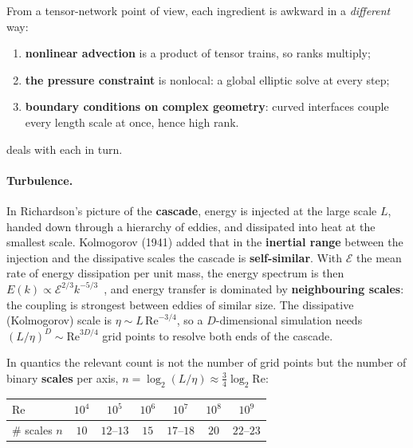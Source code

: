 From a tensor-network point of view, each ingredient is awkward in a
\emph{different} way:
\begin{enumerate}
  \item \textbf{nonlinear advection} is a product of tensor trains, so ranks
    multiply;
  \item \textbf{the pressure constraint} is nonlocal: a global elliptic solve
    at every step;
  \item \textbf{boundary conditions on complex geometry}: curved interfaces
    couple every length scale at once, hence high rank.
\end{enumerate}
\noindent
{} deals with each in turn.

\paragraph{Turbulence.}
In Richardson's picture of the \textbf{cascade}, energy is injected at the large
scale $L$, handed down through a hierarchy of eddies, and dissipated into heat at
the smallest scale. Kolmogorov (1941) added that in the \textbf{inertial range}
between the injection and the dissipative scales the cascade is
\textbf{self-similar}. With $\mathcal{E}$ the mean rate of energy dissipation per
unit mass, the energy spectrum is then
$E(k) \propto \mathcal{E}^{2/3} k^{-5/3}$~\cite{Kolmogorov1941,Frisch1995}, and
energy transfer is dominated by \textbf{neighbouring scales}: the coupling is
strongest between eddies of similar size. The dissipative (Kolmogorov) scale is
$\eta \sim L\,\mathrm{Re}^{-3/4}$, so a $D$-dimensional simulation needs
$(L/\eta)^D \sim \mathrm{Re}^{3D/4}$ grid points to resolve both ends of the
cascade.

In quantics the relevant count is not the number of grid points but the number
of binary \textbf{scales} per axis, $n = \log_2(L/\eta) \approx \tfrac34
\log_2\mathrm{Re}$:
\begin{center}
  \begin{tabular}{@{}lcccccc@{}}
    \toprule
    $\mathrm{Re}$ & $10^4$ & $10^5$ & $10^6$ & $10^7$ & $10^8$ & $10^9$ \\
    \midrule
    \# scales $n$ & $10$ & $12$--$13$ & $15$ & $17$--$18$ & $20$ & $22$--$23$ \\
    \bottomrule
  \end{tabular}
\end{center}


